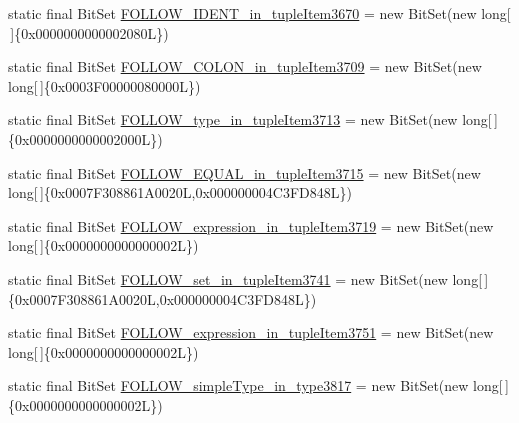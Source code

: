 \begin{DoxyCompactItemize}
\item 
static final Bit\-Set \hyperlink{classorg_1_1tzi_1_1use_1_1parser_1_1shell_1_1_shell_command_parser_a78bc42407b1cf0b7208e4a45868bf366}{F\-O\-L\-L\-O\-W\-\_\-\-I\-D\-E\-N\-T\-\_\-in\-\_\-tuple\-Item3670} = new Bit\-Set(new long\mbox{[}$\,$\mbox{]}\{0x0000000000002080\-L\})
\item 
static final Bit\-Set \hyperlink{classorg_1_1tzi_1_1use_1_1parser_1_1shell_1_1_shell_command_parser_aaf44f60900292a5ecb18a175c4183959}{F\-O\-L\-L\-O\-W\-\_\-\-C\-O\-L\-O\-N\-\_\-in\-\_\-tuple\-Item3709} = new Bit\-Set(new long\mbox{[}$\,$\mbox{]}\{0x0003\-F00000080000\-L\})
\item 
static final Bit\-Set \hyperlink{classorg_1_1tzi_1_1use_1_1parser_1_1shell_1_1_shell_command_parser_a64a529a5e7ffcef82cd055ac45d62290}{F\-O\-L\-L\-O\-W\-\_\-type\-\_\-in\-\_\-tuple\-Item3713} = new Bit\-Set(new long\mbox{[}$\,$\mbox{]}\{0x0000000000002000\-L\})
\item 
static final Bit\-Set \hyperlink{classorg_1_1tzi_1_1use_1_1parser_1_1shell_1_1_shell_command_parser_a33a88795f3fac401ab3a249c5e7bdf38}{F\-O\-L\-L\-O\-W\-\_\-\-E\-Q\-U\-A\-L\-\_\-in\-\_\-tuple\-Item3715} = new Bit\-Set(new long\mbox{[}$\,$\mbox{]}\{0x0007\-F308861\-A0020\-L,0x000000004\-C3\-F\-D848\-L\})
\item 
static final Bit\-Set \hyperlink{classorg_1_1tzi_1_1use_1_1parser_1_1shell_1_1_shell_command_parser_a6971014d2183a8c8018565b1bd8a5bc0}{F\-O\-L\-L\-O\-W\-\_\-expression\-\_\-in\-\_\-tuple\-Item3719} = new Bit\-Set(new long\mbox{[}$\,$\mbox{]}\{0x0000000000000002\-L\})
\item 
static final Bit\-Set \hyperlink{classorg_1_1tzi_1_1use_1_1parser_1_1shell_1_1_shell_command_parser_a8b19b72d0babe37a7bf541a011162c2f}{F\-O\-L\-L\-O\-W\-\_\-set\-\_\-in\-\_\-tuple\-Item3741} = new Bit\-Set(new long\mbox{[}$\,$\mbox{]}\{0x0007\-F308861\-A0020\-L,0x000000004\-C3\-F\-D848\-L\})
\item 
static final Bit\-Set \hyperlink{classorg_1_1tzi_1_1use_1_1parser_1_1shell_1_1_shell_command_parser_adc09a7a3106c2202774fa18db60d939e}{F\-O\-L\-L\-O\-W\-\_\-expression\-\_\-in\-\_\-tuple\-Item3751} = new Bit\-Set(new long\mbox{[}$\,$\mbox{]}\{0x0000000000000002\-L\})
\item 
static final Bit\-Set \hyperlink{classorg_1_1tzi_1_1use_1_1parser_1_1shell_1_1_shell_command_parser_a25ee18a7590b51d5ceb0ee5060438616}{F\-O\-L\-L\-O\-W\-\_\-simple\-Type\-\_\-in\-\_\-type3817} = new Bit\-Set(new long\mbox{[}$\,$\mbox{]}\{0x0000000000000002\-L\})
\item 

\end{DoxyCompactItemize}
